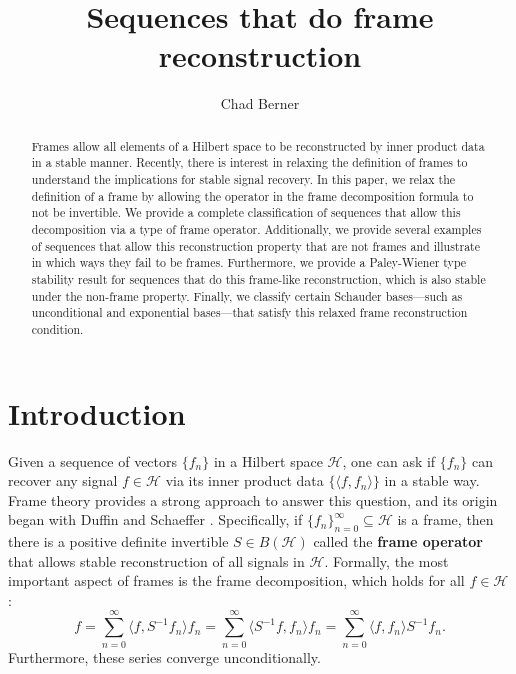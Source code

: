 \documentclass[11pt]{amsart}
\title{Sequences that do frame reconstruction}
\author{Chad Berner}
\theoremstyle{definition}
\numberwithin{equation}{section}
\newcommand{\Hcal}{\mathcal{H}} %
\begin{document}
\begin{abstract}
Frames allow all elements of a Hilbert space to be reconstructed by inner product data in a stable manner. Recently, there is interest in relaxing the definition of frames to understand the implications for stable signal recovery. In this paper, we relax the definition of a frame by allowing the operator in the frame decomposition formula to not be invertible. We provide a complete classification of sequences that allow this decomposition via a type of frame operator. Additionally, we provide several examples of sequences that allow this reconstruction property that are not frames and illustrate in which ways they fail to be frames. Furthermore, we provide a Paley-Wiener type stability result for sequences that do this frame-like reconstruction, which is also stable under the non-frame property. Finally, we classify certain Schauder bases—such as unconditional and exponential bases—that satisfy this relaxed frame reconstruction condition.
\end{abstract}

\maketitle


\section{Introduction}
Given a sequence of vectors $\{f_n\}$ in a Hilbert space $\Hcal$, one can ask if $\{f_n\}$ can recover any signal $f\in \Hcal$ via its inner product data $\{\langle f, f_n\rangle\}$ in a stable way. Frame theory provides a strong approach to answer this question, and its origin began with Duffin and Schaeffer \cite{Duffin1952Class}. Specifically, if $\{f_n\}_{n=0}^{\infty}\subseteq \Hcal$ is a frame, then there is a positive definite invertible $S\in B(\Hcal)$ called the \textbf{frame operator} that allows stable reconstruction of all signals in $\Hcal$. Formally, the most important aspect of frames is the frame decomposition, which holds for all $f\in \Hcal$:
\begin{equation}\label{framedecomp}
f=\sum_{n=0}^{\infty} \langle f, S^{-1}f_n\rangle f_n=\sum_{n=0}^{\infty}\langle S^{-1}f,f_n\rangle f_n=\sum_{n=0}^{\infty} \langle f, f_n\rangle S^{-1}f_n.    
\end{equation}
Furthermore, these series converge unconditionally.
\end{document}
